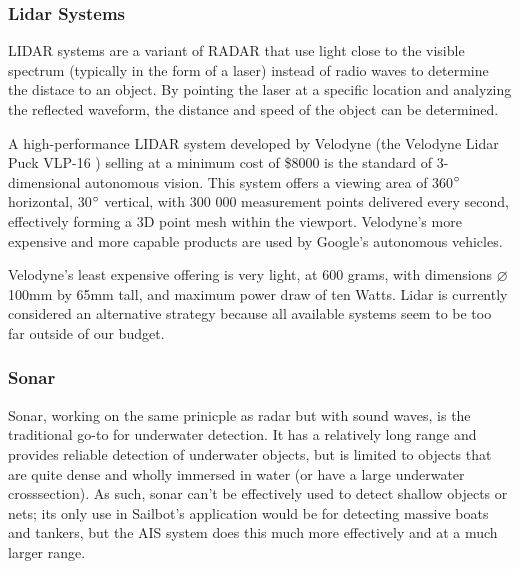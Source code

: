 \subsubsection{\label{sec:intro:alternatives:lidar}Lidar Systems}
LIDAR systems are a variant of RADAR that use light close to the visible spectrum (typically in the form of a laser) instead of radio waves to determine the distace to an object. By pointing the laser at a specific location and analyzing the reflected waveform, the distance and speed of the object can be determined. 

A high-performance LIDAR system developed by Velodyne (the Velodyne Lidar Puck VLP-16 \cite{velodyne-vlp16}) selling at a minimum cost of \$8000 is the standard of 3-dimensional autonomous vision. This system offers a viewing area of 360$\degree$ horizontal, 30$\degree$ vertical, with 300 000 measurement points delivered every second, effectively forming a 3D point mesh within the viewport. Velodyne's more expensive and more capable products are used by Google's autonomous vehicles.

Velodyne's least expensive offering is very light, at 600 grams, with dimensions $\varnothing$100mm by 65mm tall, and maximum power draw of ten Watts. Lidar is currently considered an alternative strategy because all available systems seem to be too far outside of our budget.


\subsubsection{\label{sec:intro:alternatives:sar}Sonar}
Sonar, working on the same prinicple as radar but with sound waves, is the traditional go-to for underwater detection. It has a relatively long range and provides reliable detection of underwater objects, but is limited to objects that are quite dense and wholly immersed in water (or have a large underwater crosssection). As such, sonar can't be effectively used to detect shallow objects or nets; its only use in Sailbot's application would be for detecting massive boats and tankers, but the AIS system does this much more effectively and at a much larger range.
